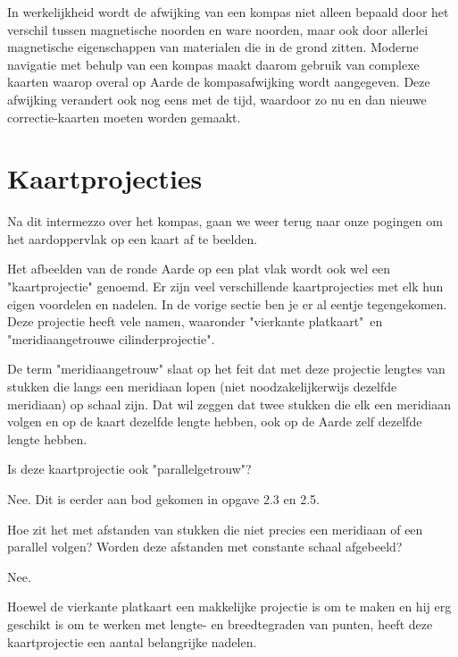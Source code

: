 In werkelijkheid wordt de afwijking van een kompas niet alleen bepaald door het verschil tussen magnetische noorden en ware noorden, maar ook door allerlei magnetische eigenschappen van materialen die in de grond zitten. Moderne navigatie met behulp van een kompas maakt daarom gebruik van complexe kaarten waarop overal op Aarde de kompasafwijking wordt aangegeven. Deze afwijking verandert ook nog eens met de tijd, waardoor zo nu en dan nieuwe correctie-kaarten moeten worden gemaakt.

\section{Kaartprojecties}

Na dit intermezzo over het kompas, gaan we weer terug naar onze pogingen om het aardoppervlak op een kaart af te beelden.

Het afbeelden van de ronde Aarde op een plat vlak wordt ook wel een "kaartprojectie"  genoemd. Er zijn veel verschillende kaartprojecties met elk hun eigen voordelen en nadelen. In de vorige sectie ben je er al eentje tegengekomen. Deze projectie heeft vele namen, waaronder "vierkante platkaart"\ en "meridiaangetrouwe cilinderprojectie".

De term "meridiaangetrouw"  slaat op het feit dat met deze projectie lengtes van stukken die langs een meridiaan lopen (niet noodzakelijkerwijs dezelfde meridiaan) op schaal zijn. Dat wil zeggen dat twee stukken die elk een meridiaan volgen en op de kaart dezelfde lengte hebben, ook op de Aarde zelf dezelfde lengte hebben.

\begin{opgave}
	\begin{subopgave}
		Is deze kaartprojectie ook "parallelgetrouw"?
		\begin{antwoord}
			Nee. Dit is eerder aan bod gekomen in opgave 2.3 en 2.5.
		\end{antwoord}
	\end{subopgave}
	\begin{subopgave}
		Hoe zit het met afstanden van stukken die niet precies een meridiaan of een parallel volgen? Worden deze afstanden met constante schaal afgebeeld?
		\begin{antwoord}
			Nee.
		\end{antwoord}
	\end{subopgave}
\end{opgave}

Hoewel de vierkante platkaart een makkelijke projectie is om te maken en hij erg geschikt is om te werken met lengte- en breedtegraden van punten, heeft deze kaartprojectie een aantal belangrijke nadelen.

